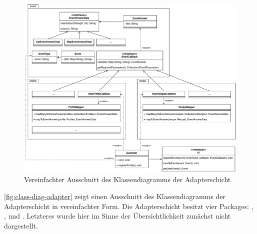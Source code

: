 \begin{figure}[ht!]
    \includegraphics[width=0.98\columnwidth]{../diagrams/adapter_uml.pdf}
    \caption{Vereinfachter Ausschnitt des Klassendiagramms der Adapterschicht}
    \label{fig:class-diag-adapter}
\end{figure}

\autoref{fig:class-diag-adapter} zeigt einen Ausschnitt des Klassendiagramms der Adapterschicht in vereinfachter Form. Die Adapterschicht besitzt vier Packages: \href{https://github.com/anditru/quickie/tree/bb41442c7f1ffbfcd3117cd86a40f7932e543a33/1-quickie-adapters/src/main/java/org/pinkcrazyunicorn/quickie/adapters/callbacks}{}, \href{https://github.com/anditru/quickie/tree/bb41442c7f1ffbfcd3117cd86a40f7932e543a33/1-quickie-adapters/src/main/java/org/pinkcrazyunicorn/quickie/adapters/event}{}, \href{https://github.com/anditru/quickie/tree/bb41442c7f1ffbfcd3117cd86a40f7932e543a33/1-quickie-adapters/src/main/java/org/pinkcrazyunicorn/quickie/adapters/mappers}{} und \href{https://github.com/anditru/quickie/tree/bb41442c7f1ffbfcd3117cd86a40f7932e543a33/1-quickie-adapters/src/main/java/org/pinkcrazyunicorn/quickie/adapters/persistence}{}. Letzteres wurde hier im Sinne der Übersichtlichkeit zunächst nicht dargestellt.

